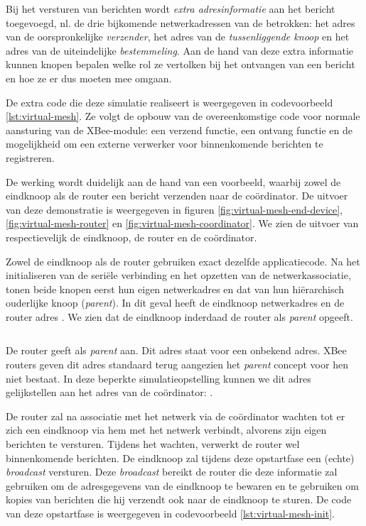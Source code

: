 Bij het versturen van berichten wordt \emph{extra adresinformatie} aan het
bericht toegevoegd, nl. de drie bijkomende netwerkadressen van de betrokken:
het adres van de oorspronkelijke \emph{verzender}, het adres van de
\emph{tussenliggende knoop} en het adres van de uiteindelijke
\emph{bestemmeling}. Aan de hand van deze extra informatie kunnen knopen
bepalen welke rol ze vertolken bij het ontvangen van een bericht en hoe ze er
dus moeten mee omgaan.

De extra code die deze simulatie realiseert is weergegeven in codevoorbeeld
\ref{lst:virtual-mesh}. Ze volgt de opbouw van de overeenkomstige code voor
normale aansturing van de XBee-module: een verzend functie, een ontvang functie
en de mogelijkheid om een externe verwerker voor binnenkomende berichten te
registreren.

De werking wordt duidelijk aan de hand van een voorbeeld, waarbij zowel de
eindknoop als de router een bericht verzenden naar de co\"ordinator. De
uitvoer van deze demonstratie is weergegeven in figuren
\ref{fig:virtual-mesh-end-device}, \ref{fig:virtual-mesh-router} en
\ref{fig:virtual-mesh-coordinator}. We zien de uitvoer van respectievelijk de
eindknoop, de router en de co\"ordinator.

Zowel de eindknoop als de router gebruiken exact dezelfde applicatiecode. Na
het initialiseren van de seri\"ele verbinding en het opzetten van de
netwerkassociatie, tonen beide knopen eerst hun eigen netwerkadres en dat van
hun hi\"erarchisch ouderlijke knoop (\emph{parent}). In dit geval heeft de
eindknoop netwerkadres  en de router adres . We zien dat
de eindknoop inderdaad de router als \emph{parent} opgeeft.

\inputminted[linenos,frame=lines,framesep=2mm,fontsize=\footnotesize,firstline=97,firstnumber=97]{c}{../src/demo/lib/network.c}
\vspace{-5mm}
\vspace{3mm}

De router geeft als \emph{parent}  aan. Dit adres staat voor een
onbekend adres. XBee routers geven dit adres standaard terug aangezien het
\emph{parent} concept voor hen niet bestaat. In deze beperkte
simulatieopstelling kunnen we dit adres gelijkstellen aan het adres van de
co\"ordinator: .

De router zal na associatie met het netwerk via de co\"ordinator wachten tot er
zich een eindknoop via hem met het netwerk verbindt, alvorens zijn eigen
berichten te versturen. Tijdens het wachten, verwerkt de router wel
binnenkomende berichten. De eindknoop zal tijdens deze opstartfase een (echte)
\emph{broadcast} versturen. Deze \emph{broadcast} bereikt de router die deze
informatie zal gebruiken om de adresgegevens van de eindknoop te bewaren en te
gebruiken om kopies van berichten die hij verzendt ook naar de eindknoop te
sturen. De code van deze opstartfase is weergegeven in codevoorbeeld
\ref{lst:virtual-mesh-init}.

